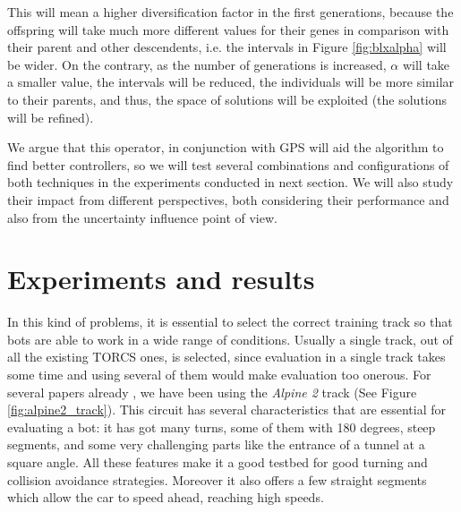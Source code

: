 \documentclass[10pt,journal,compsoc]{IEEEtran}
\begin{document}
This will mean a higher diversification factor in the first generations, because the offspring will take much more different values for their genes in comparison with their parent and other descendents, i.e. the intervals in Figure \ref{fig:blxalpha} will be wider. 
On the contrary, as the number of generations is increased, $\alpha$ will take a smaller value, the intervals will be reduced, the individuals will be more similar to their parents, and thus, the space of solutions will be exploited (the solutions will be refined).

We argue that this operator, in conjunction with GPS will aid the algorithm to find better controllers, so we will test several combinations and configurations of both techniques in the experiments conducted in next section. We will also study their impact from different perspectives, both considering their performance and also from the uncertainty influence point of view.



\section{Experiments and results}  
\label{sec:results}


In this kind of problems, it is essential to select the correct
training track so that bots are able to work in a wide range of
conditions. Usually a single track, out of all the existing TORCS
ones, is selected, since evaluation in a single track takes some time
and using several of them would make evaluation too onerous. For
several papers already \cite{salem_cig2018,DBLP:conf/cig/SalemMG19},
we have been using the \textit{Alpine 2} track (See Figure
\ref{fig:alpine2_track}). This circuit has several characteristics that
are essential for evaluating a bot: it has got many turns, some of
them with 180 degrees, steep segments, and some very challenging parts
like the entrance of a tunnel at a square angle. All these features make
it a good testbed for good turning and collision avoidance
strategies. Moreover it also offers a few straight segments which allow the car to speed ahead, reaching high speeds. 
\end{document}
